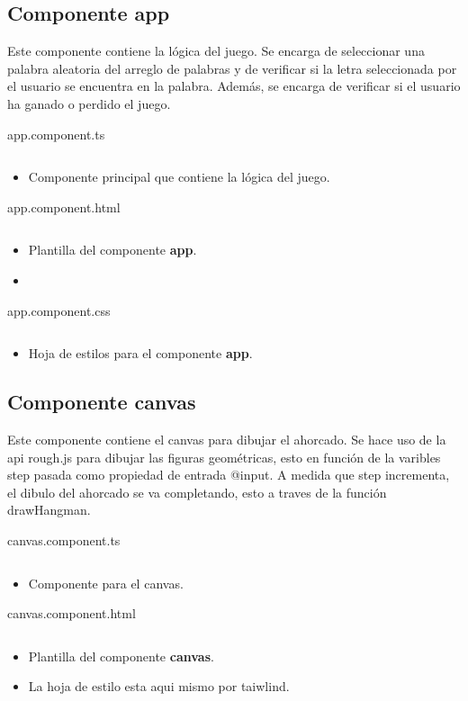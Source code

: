 \documentclass{article}
\newenvironment{block}{\captionsetup{type=listing}}{}
\begin{document}
\subsection{Componente app}
Este componente contiene la lógica del juego. Se encarga de seleccionar una palabra aleatoria del arreglo de palabras y de verificar si la letra seleccionada por el usuario se encuentra en la palabra. Además, se encarga de verificar si el usuario ha ganado o perdido el juego.
\begin{block}
\caption{app.component.ts}
\inputminted{TypeScript}{../hangMan/src/app/app.component.ts}
\begin{itemize}
	\item Componente principal que contiene la lógica del juego.
\end{itemize}

\caption{app.component.html}
\inputminted{HTML}{../hangMan/src/app/app.component.html}
\begin{itemize}
	\item Plantilla del componente \textbf{app}.
	\item
\end{itemize}

\caption{app.component.css}
\inputminted{CSS}{../hangMan/src/app/app.component.css}
\begin{itemize}
	\item Hoja de estilos para el componente \textbf{app}.
\end{itemize}
\end{block}
\pagebreak

\subsection{Componente canvas}
Este componente contiene el canvas para dibujar el ahorcado. Se hace uso de la api rough.js para dibujar las figuras geométricas, esto en función de la varibles step pasada como propiedad de entrada @input. A medida que step incrementa, el dibulo del ahorcado se va completando, esto a traves de la función drawHangman.


\begin{block}
	\caption{canvas.component.ts}
	\inputminted{TypeScript}{../hangMan/src/app/canvas/canvas.component.ts}
	\begin{itemize}
		\item Componente para el canvas.
	\end{itemize}

	\caption{canvas.component.html}
	\inputminted{HTML}{../hangMan/src/app/canvas/canvas.component.html}
	\begin{itemize}
		\item Plantilla del componente \textbf{canvas}.
		\item La hoja de estilo esta aqui mismo por taiwlind.
	\end{itemize}
\end{block}
\pagebreak
\end{document}

